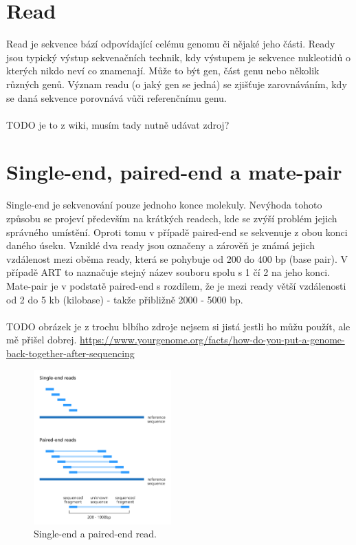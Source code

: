 \documentclass[czech,DP]{thesiskiv}
\numberwithin{equation}{section}
\begin{document}
\section{Read}
Read je sekvence bází odpovídající celému genomu či nějaké jeho části. Ready jsou typický výstup sekvenačních technik, kdy výstupem je sekvence nukleotidů o kterých nikdo neví co znamenají. Může to být gen, část genu nebo několik různých genů. Význam readu (o jaký gen se jedná) se zjišťuje zarovnáváním, kdy se daná sekvence porovnává vůči referenčnímu genu.
\\
\\
TODO je to z wiki, musím tady nutně udávat zdroj?   
\section{Single-end, paired-end a mate-pair}
Single-end je sekvenování pouze jednoho konce molekuly. Nevýhoda tohoto způsobu se projeví především na krátkých readech, kde se zvýší problém jejich správného umístění. Oproti tomu v případě paired-end se sekvenuje z obou konci daného úseku. Vzniklé dva ready jsou označeny a zárověň je známá jejich vzdálenost mezi oběma ready, která se pohybuje od 200 do 400 bp (base pair). V případě ART to naznačuje stejný název souboru spolu s 1 čí 2 na jeho konci. Mate-pair je v podstatě paired-end s rozdílem, že je mezi ready větší vzdálenosti od 2 do 5 kb (kilobase) - takže přibližně 2000 - 5000 bp. \cite{illumina}  
\\
\\
TODO obrázek je z trochu blbího zdroje nejsem si jistá jestli ho můžu použít, ale mě přišel dobrej. \url{https://www.yourgenome.org/facts/how-do-you-put-a-genome-back-together-after-sequencing}
\begin{figure}[H]		
		\centering
		\includegraphics[width=200px]{./img/single_end_pair_end_reads_yourgenome.png}
		\caption{Single-end a paired-end read.}
		\label{fig:single_end_paired_end}
\end{figure}
\end{document}
